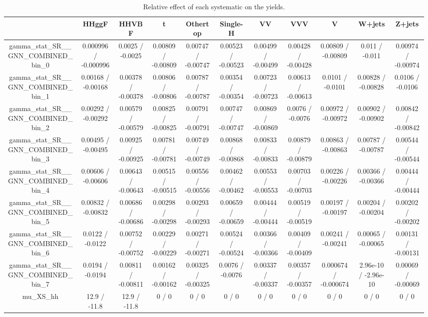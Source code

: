 \documentclass[10pt]{article}
\begin{document}
\begin{table}[htbp]
\begin{center}
\begin{tabular}{|c|c|c|c|c|c|c|c|c|c|c|}
\hline 
      & HHggF      & HHVBF      & t      & Othertop      & Single-H      & VV      & VVV      & V      & W+jets      & Z+jets \\ 
\hline 
  gamma_stat_SR__GNN_COMBINED_bin_0 & 0.000996 / -0.000996 & 0.0025 / -0.0025 & 0.00809 / -0.00809 & 0.00747 / -0.00747 & 0.00523 / -0.00523 & 0.00499 / -0.00499 & 0.00428 / -0.00428 & 0.00809 / -0.00809 & 0.011 / -0.011 & 0.00974 / -0.00974 \\ 
  gamma_stat_SR__GNN_COMBINED_bin_1 & 0.00168 / -0.00168 & 0.00378 / -0.00378 & 0.00806 / -0.00806 & 0.00787 / -0.00787 & 0.00354 / -0.00354 & 0.00723 / -0.00723 & 0.00613 / -0.00613 & 0.0101 / -0.0101 & 0.00828 / -0.00828 & 0.0106 / -0.0106 \\ 
  gamma_stat_SR__GNN_COMBINED_bin_2 & 0.00292 / -0.00292 & 0.00579 / -0.00579 & 0.00825 / -0.00825 & 0.00791 / -0.00791 & 0.00747 / -0.00747 & 0.00869 / -0.00869 & 0.0076 / -0.0076 & 0.00972 / -0.00972 & 0.00902 / -0.00902 & 0.00842 / -0.00842 \\ 
  gamma_stat_SR__GNN_COMBINED_bin_3 & 0.00495 / -0.00495 & 0.00925 / -0.00925 & 0.00781 / -0.00781 & 0.00749 / -0.00749 & 0.00868 / -0.00868 & 0.00833 / -0.00833 & 0.00879 / -0.00879 & 0.00863 / -0.00863 & 0.00787 / -0.00787 & 0.00544 / -0.00544 \\ 
  gamma_stat_SR__GNN_COMBINED_bin_4 & 0.00606 / -0.00606 & 0.00643 / -0.00643 & 0.00515 / -0.00515 & 0.00556 / -0.00556 & 0.00462 / -0.00462 & 0.00553 / -0.00553 & 0.00703 / -0.00703 & 0.00226 / -0.00226 & 0.00366 / -0.00366 & 0.00444 / -0.00444 \\ 
  gamma_stat_SR__GNN_COMBINED_bin_5 & 0.00832 / -0.00832 & 0.00686 / -0.00686 & 0.00298 / -0.00298 & 0.00293 / -0.00293 & 0.00659 / -0.00659 & 0.00444 / -0.00444 & 0.00519 / -0.00519 & 0.00197 / -0.00197 & 0.00204 / -0.00204 & 0.00202 / -0.00202 \\ 
  gamma_stat_SR__GNN_COMBINED_bin_6 & 0.0122 / -0.0122 & 0.00752 / -0.00752 & 0.00229 / -0.00229 & 0.00271 / -0.00271 & 0.00524 / -0.00524 & 0.00366 / -0.00366 & 0.00409 / -0.00409 & 0.00241 / -0.00241 & 0.00065 / -0.00065 & 0.00131 / -0.00131 \\ 
  gamma_stat_SR__GNN_COMBINED_bin_7 & 0.0194 / -0.0194 & 0.00811 / -0.00811 & 0.00162 / -0.00162 & 0.00325 / -0.00325 & 0.0076 / -0.0076 & 0.00337 / -0.00337 & 0.00357 / -0.00357 & 0.000674 / -0.000674 & 2.96e-10 / -2.96e-10 & 0.00069 / -0.00069 \\ 
  mu_XS_hh & 12.9 / -11.8 & 12.9 / -11.8 & 0 / 0 & 0 / 0 & 0 / 0 & 0 / 0 & 0 / 0 & 0 / 0 & 0 / 0 & 0 / 0 \\ 
\hline 
\end{tabular} 
\caption{Relative effect of each systematic on the yields.} 
\end{center} 
\end{table} 
\end{document}
